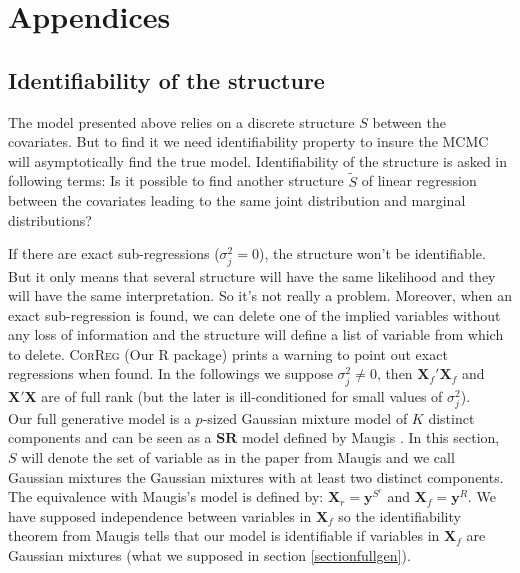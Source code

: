 \documentclass[11pt,a4paper]{article}
\begin{document}
\section{Appendices}
	\subsection{Identifiability of the structure} \label{preuveident}
	The model presented above relies on a discrete structure $S$ between the covariates. But to find it we need identifiability property to insure the MCMC will asymptotically find the true model. Identifiability of the structure is asked in following terms: Is it possible to find another structure $\tilde{S}$ of linear regression between the covariates leading to the same joint distribution and marginal distributions? 
	
		If there are exact sub-regressions ($\sigma^2_j=0$), the structure won't be identifiable. But it only means that several structure will have the same likelihood and they will have the same interpretation. So it's not really a problem. Moreover, when an exact sub-regression is found, we can delete one of the implied variables without any loss of information and the structure will define a list of variable from which to delete. \textsc{CorReg} (Our R package) prints a warning to point out exact regressions when found.
	In the followings we suppose $\sigma^2_j\neq 0$, then $\boldsymbol{X}_f'\boldsymbol{X}_f$ and $\boldsymbol{X}'\boldsymbol{X}$ are of full rank (but the later is ill-conditioned for small values of $\sigma^2_j$).
	\\
	
Our full generative model is a $p$-sized Gaussian mixture model of $K$ distinct components and 
%	
	can be seen as a $\mathbf{SR}$ model defined by Maugis \cite{maugis2009variable}. In this section, $S$ will denote the set of variable as in the paper from Maugis and we call Gaussian mixtures the Gaussian mixtures with at least two distinct components. The equivalence with Maugis's model is defined by:
	$\boldsymbol{X}_r=\boldsymbol{y}^{S^c}$ and $\boldsymbol{X}_f=\boldsymbol{y}^R$. We have supposed independence between variables in $\boldsymbol{X}_f$ so the identifiability theorem from Maugis tells that our model is identifiable if variables in $\boldsymbol{X}_f$ are Gaussian mixtures (what we supposed in section \ref{sectionfullgen}).
	\\
	
\end{document}
